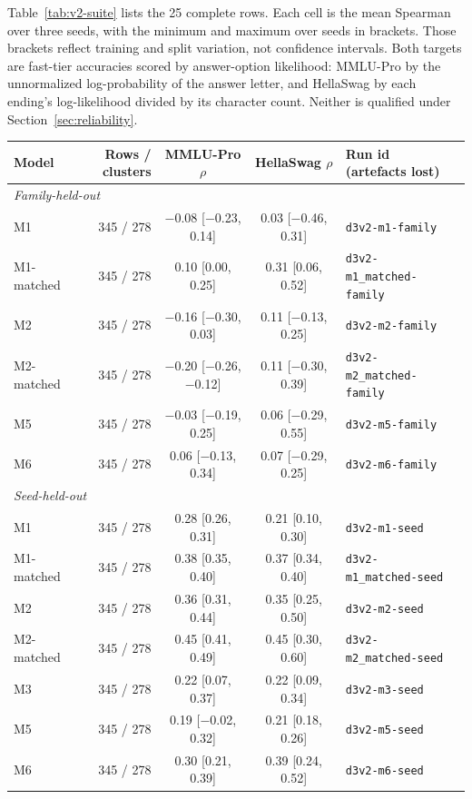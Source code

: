 Table~\ref{tab:v2-suite} lists the 25 complete rows. Each cell is the mean Spearman over three seeds, with the minimum and maximum over seeds in brackets. Those brackets reflect training and split variation, not confidence intervals. Both targets are fast-tier accuracies scored by answer-option likelihood: MMLU-Pro by the unnormalized log-probability of the answer letter, and HellaSwag by each ending's log-likelihood divided by its character count. Neither is qualified under Section~\ref{sec:reliability}.
\begin{table}[t]
\centering
\footnotesize
\setlength{\tabcolsep}{3pt}
\begin{tabular}{lrcclc}\toprule
Model & Rows / clusters & MMLU-Pro $\rho$ & HellaSwag $\rho$ & Run id (artefacts lost) \\\midrule
\multicolumn{5}{l}{\emph{Family-held-out}} \\
M1 & 345 / 278 & $-$0.08 [$-$0.23, 0.14] & 0.03 [$-$0.46, 0.31] & \texttt{d3v2-m1-family} \\
M1-matched & 345 / 278 & 0.10 [0.00, 0.25] & 0.31 [0.06, 0.52] & \texttt{d3v2-m1\_matched-family} \\
M2 & 345 / 278 & $-$0.16 [$-$0.30, 0.03] & 0.11 [$-$0.13, 0.25] & \texttt{d3v2-m2-family} \\
M2-matched & 345 / 278 & $-$0.20 [$-$0.26, $-$0.12] & 0.11 [$-$0.30, 0.39] & \texttt{d3v2-m2\_matched-family} \\
M5 & 345 / 278 & $-$0.03 [$-$0.19, 0.25] & 0.06 [$-$0.29, 0.55] & \texttt{d3v2-m5-family} \\
M6 & 345 / 278 & 0.06 [$-$0.13, 0.34] & 0.07 [$-$0.29, 0.25] & \texttt{d3v2-m6-family} \\
\multicolumn{5}{l}{\emph{Seed-held-out}} \\
M1 & 345 / 278 & 0.28 [0.26, 0.31] & 0.21 [0.10, 0.30] & \texttt{d3v2-m1-seed} \\
M1-matched & 345 / 278 & 0.38 [0.35, 0.40] & 0.37 [0.34, 0.40] & \texttt{d3v2-m1\_matched-seed} \\
M2 & 345 / 278 & 0.36 [0.31, 0.44] & 0.35 [0.25, 0.50] & \texttt{d3v2-m2-seed} \\
M2-matched & 345 / 278 & 0.45 [0.41, 0.49] & 0.45 [0.30, 0.60] & \texttt{d3v2-m2\_matched-seed} \\
M3 & 345 / 278 & 0.22 [0.07, 0.37] & 0.22 [0.09, 0.34] & \texttt{d3v2-m3-seed} \\
M5 & 345 / 278 & 0.19 [$-$0.02, 0.32] & 0.21 [0.18, 0.26] & \texttt{d3v2-m5-seed} \\
M6 & 345 / 278 & 0.30 [0.21, 0.39] & 0.39 [0.24, 0.52] & \texttt{d3v2-m6-seed} \\

\end{tabular}
\end{table}
